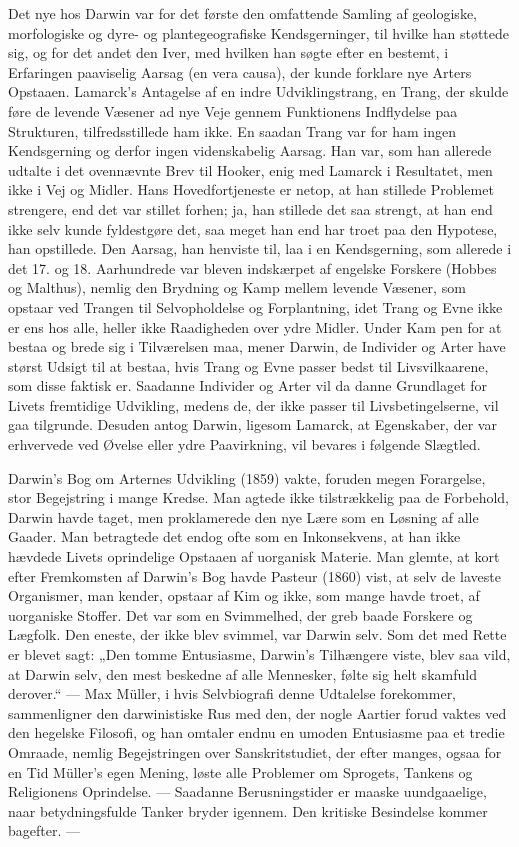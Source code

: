 \documentclass[12pt,a4paper,openany]{book}
\newcommand{\opage}[1]{\marginnote{\footnotesize\textit{[#1]}}}
\begin{document}
Det nye hos Darwin var for det første den omfattende Samling af
geologiske, morfologiske og dyre- og plantegeografiske Kendsgerninger,
til hvilke han støttede sig, og for det andet den Iver, med hvilken
han søgte efter en bestemt, i Erfaringen paaviselig Aarsag (en
vera causa), der kunde forklare nye Arters Opstaaen. Lamarck’s
Antagelse af en indre Udviklingstrang, en Trang, der skulde føre de
levende Væsener ad nye Veje gennem Funktionens Indflydelse paa
Strukturen, tilfredsstillede ham ikke. En saadan Trang var for ham
ingen Kendsgerning og derfor ingen videnskabelig Aarsag. Han var,
som han allerede udtalte i det ovennævnte Brev til Hooker, enig
med Lamarck i Resultatet, men ikke i Vej og Midler. Hans Hovedfortjeneste
er netop, at han stillede Problemet strengere, end det
var stillet forhen; ja, han stillede det saa strengt, at han end ikke
selv kunde fyldestgøre det, saa meget han end har troet paa den
Hypotese, han opstillede. Den Aarsag, han henviste til, laa i en
Kendsgerning, som allerede i det 17. og 18. Aarhundrede var bleven
indskærpet af engelske Forskere (Hobbes og Malthus), nemlig den
Brydning og Kamp mellem levende Væsener, som opstaar ved Trangen
til Selvopholdelse og Forplantning, idet Trang og Evne ikke er
ens hos alle, heller ikke Raadigheden over ydre Midler. Under Kam%
\opage{39}pen for at bestaa og brede sig i Tilværelsen maa, mener Darwin, de
Individer og Arter have størst Udsigt til at bestaa, hvis Trang og
Evne passer bedst til Livsvilkaarene, som disse faktisk er. Saadanne
Individer og Arter vil da danne Grundlaget for Livets fremtidige Udvikling,
medens de, der ikke passer til Livsbetingelserne, vil gaa tilgrunde.
Desuden antog Darwin, ligesom Lamarck, at Egenskaber,
der var erhvervede ved Øvelse eller ydre Paavirkning, vil bevares
i følgende Slægtled.

Darwin’s Bog om Arternes Udvikling (1859) vakte, foruden megen
Forargelse, stor Begejstring i mange Kredse. Man agtede ikke
tilstrækkelig paa de Forbehold, Darwin havde taget, men proklamerede
den nye Lære som en Løsning af alle Gaader. Man betragtede
det endog ofte som en Inkonsekvens, at han ikke hævdede Livets
oprindelige Opstaaen af uorganisk Materie. Man glemte, at kort efter
Fremkomsten af Darwin’s Bog havde Pasteur (1860) vist, at selv
de laveste Organismer, man kender, opstaar af Kim og ikke, som
mange havde troet, af uorganiske Stoffer. Det var som en Svimmelhed,
der greb baade Forskere og Lægfolk. Den eneste, der ikke blev
svimmel, var Darwin selv. Som det med Rette er blevet sagt: „Den
tomme Entusiasme, Darwin’s Tilhængere viste, blev saa vild, at
Darwin selv, den mest beskedne af alle Mennesker, følte sig helt
skamfuld derover.“ --- Max Müller, i hvis Selvbiografi denne Udtalelse
forekommer, sammenligner den darwinistiske Rus med den,
der nogle Aartier forud vaktes ved den hegelske Filosofi, og han
omtaler endnu en umoden Entusiasme paa et tredie Omraade, nemlig
Begejstringen over Sanskritstudiet, der efter manges, ogsaa for
en Tid Müller’s egen Mening, løste alle Problemer om Sprogets,
Tankens og Religionens Oprindelse. --- Saadanne Berusningstider er
maaske uundgaaelige, naar betydningsfulde Tanker bryder igennem.
Den kritiske Besindelse kommer bagefter. ---
\end{document}
